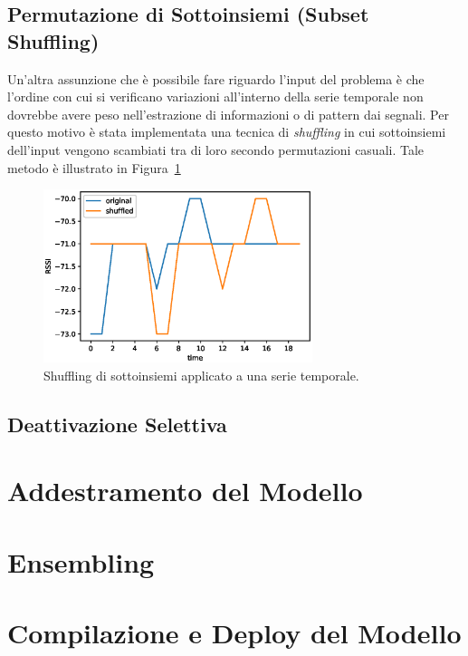 \subsection{Permutazione di Sottoinsiemi (Subset Shuffling)}
Un'altra assunzione che è possibile fare riguardo l'input del problema è che
l'ordine con cui si verificano variazioni all'interno della serie temporale non
dovrebbe avere peso nell'estrazione di informazioni o di pattern dai segnali.
Per questo motivo è stata implementata una tecnica di \emph{shuffling} in cui
sottoinsiemi dell'input vengono scambiati tra di loro secondo permutazioni
casuali. Tale metodo è illustrato in Figura~\ref{fig:shuffling}
\begin{figure}[!tp]
  \centering
  \includegraphics[width=0.70\textwidth]{./img/shuffling.eps}
  \caption{Shuffling di sottoinsiemi applicato a una serie temporale.}%
  \label{fig:shuffling}%
\end{figure}
\subsection{Deattivazione Selettiva}
\section{Addestramento del Modello}
\section{Ensembling}
\section{Compilazione e Deploy del Modello}


